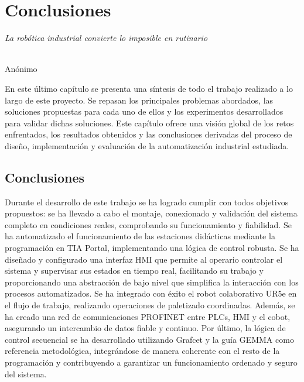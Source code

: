 \chapter{Conclusiones}
\label{cap:capitulo5}

\begin{flushright}
\begin{minipage}[]{10cm}
\emph{La robótica industrial convierte lo imposible en rutinario}\\
\end{minipage}\\

Anónimo\\
\end{flushright}

\vspace{1cm}

En este último capítulo se presenta una síntesis de todo el trabajo realizado a lo largo de este proyecto. Se repasan los principales problemas abordados, las soluciones propuestas para cada uno de ellos y los experimentos desarrollados para validar dichas soluciones. Este capítulo ofrece una visión global de los retos enfrentados, los resultados obtenidos y las conclusiones derivadas del proceso de diseño, implementación y evaluación de la automatización industrial estudiada.


\section{Conclusiones}

Durante el desarrollo de este trabajo se ha logrado cumplir con todos objetivos propuestos: se ha llevado a cabo el montaje, conexionado y validación del sistema completo en condiciones reales, comprobando su funcionamiento y fiabilidad. Se ha automatizado el funcionamiento de las estaciones didácticas mediante la programación en TIA Portal, implementando una lógica de control robusta. Se ha diseñado y configurado una interfaz HMI que permite al operario controlar el sistema y supervisar sus estados en tiempo real, facilitando su trabajo y proporcionando una abstracción de bajo nivel que simplifica la interacción con los procesos automatizados. Se ha integrado con éxito el robot colaborativo UR5e en el flujo de trabajo, realizando operaciones de paletizado coordinadas. Además, se ha creado una red de comunicaciones PROFINET entre PLCs, HMI y el cobot, asegurando un intercambio de datos fiable y continuo. Por último, la lógica de control secuencial se ha desarrollado utilizando Grafcet y la guía GEMMA como referencia metodológica, integrándose de manera coherente con el resto de la programación y contribuyendo a garantizar un funcionamiento ordenado y seguro del sistema. \\

